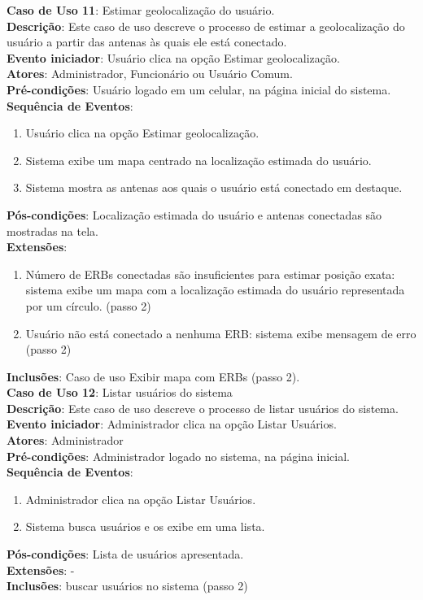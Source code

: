 \documentclass[]{politex}
\begin{document}
\noindent \textbf{Caso de Uso 11}: Estimar geolocalização do usuário. \\
\textbf{Descrição}: Este caso de uso descreve o processo de estimar a 
geolocalização do usuário a partir das antenas às quais ele está conectado. \\
\textbf{Evento iniciador}: Usuário clica na opção Estimar geolocalização. \\
\textbf{Atores}: Administrador, Funcionário ou Usuário Comum. \\
\textbf{Pré-condições}: Usuário logado em um celular, na página inicial do 
sistema. \\
\textbf{Sequência de Eventos}:
\begin{enumerate}
\item Usuário clica na opção Estimar geolocalização.
\item Sistema exibe um mapa centrado na localização estimada do usuário.
\item Sistema mostra as antenas aos quais o usuário está conectado em destaque.
\end{enumerate}
\textbf{Pós-condições}: Localização estimada do usuário e antenas conectadas são
mostradas na tela. \\
\textbf{Extensões}:
\begin{enumerate}
\item Número de ERBs conectadas são insuficientes para estimar posição exata: 
sistema exibe um mapa com a localização estimada do usuário representada por um
círculo. (passo 2)
\item Usuário não está conectado a nenhuma ERB: sistema exibe mensagem de erro
(passo 2)
\end{enumerate}
\textbf{Inclusões}: Caso de uso Exibir mapa com ERBs (passo 2). \\


\noindent \textbf{Caso de Uso 12}: Listar usuários do sistema \\
\textbf{Descrição}: Este caso de uso descreve o processo de listar usuários do 
sistema. \\
\textbf{Evento iniciador}: Administrador clica na opção Listar Usuários. \\
\textbf{Atores}: Administrador \\
\textbf{Pré-condições}: Administrador logado no sistema, na página inicial. \\
\textbf{Sequência de Eventos}:
\begin{enumerate}
\item Administrador clica na opção Listar Usuários.
\item Sistema busca usuários e os exibe em uma lista.
\end{enumerate}
\textbf{Pós-condições}: Lista de usuários apresentada. \\
\textbf{Extensões}: - \\
\textbf{Inclusões}: buscar usuários no sistema (passo 2) \\
\end{document}
